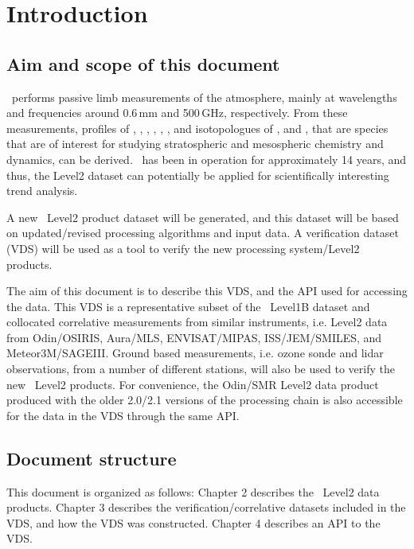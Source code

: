 \chapter{Introduction}
\label{chapter:introduction}


\setcounter{page}{1}


\section{Aim and scope of this document}
\label{sec:aim}
\smr\ performs passive limb measurements of the atmosphere,
mainly at wavelengths and frequencies around 0.6\,mm and 500\,GHz,
respectively.
From these measurements, profiles of 
, , , , 
, , and isotopologues of , and ,
that are species that are of interest for studying stratospheric and 
mesospheric chemistry and dynamics, can be derived. 
\smr\ has been in operation for approximately 14 years, and thus, the Level2
dataset can potentially be applied for scientifically interesting trend analysis.

A new \smr\ Level2 product dataset will be generated, and this dataset will be based
on updated/revised processing algorithms and input data.
A verification dataset (VDS) will be used as a tool to verify the new 
processing system/Level2 products.

The aim of this document is to describe this VDS, and the API used for
accessing the data.
This VDS is a representative subset of the \smr\ Level1B dataset
and collocated correlative measurements from similar
instruments, i.e. Level2 data from Odin/OSIRIS, Aura/MLS, ENVISAT/MIPAS,
ISS/JEM/SMILES, and Meteor3M/SAGEIII.   
Ground based measurements, i.e. ozone sonde and lidar observations,
from a number of different stations, will also be used
to verify the new \smr\ Level2 products.  
For convenience, the Odin/SMR Level2 data product produced with the older
2.0/2.1 versions of the processing chain is also accessible for the data in the
VDS through the same API.

\section{Document structure}

This document is organized as follows:
Chapter 2 describes the \smr\ Level2 data products.
Chapter 3 describes the verification/correlative datasets
included in the VDS, and how the VDS was constructed.
Chapter 4 describes an API to the VDS.

